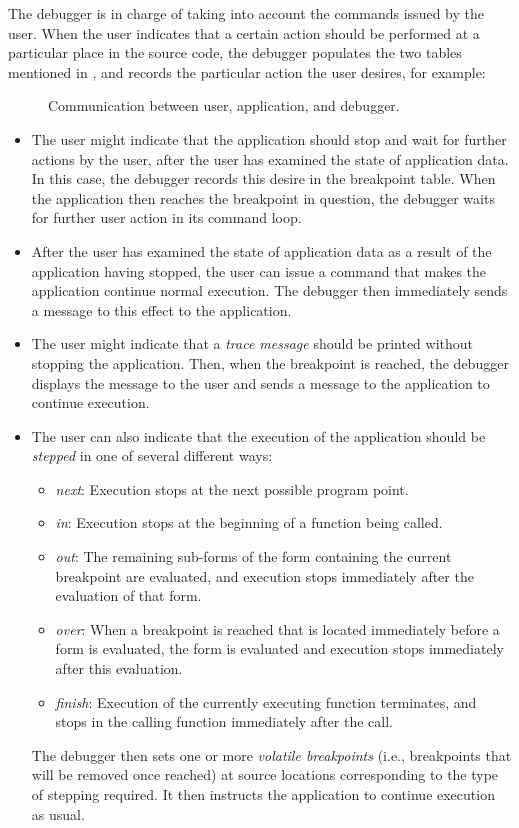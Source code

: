 The debugger is in charge of taking into account the commands issued
by the user.  When the user indicates that a certain action should be
performed at a particular place in the source code, the debugger
populates the two tables mentioned in ,
and records the particular action the user desires, for example:

\begin{figure}
\begin{center}
\end{center}
\caption{\label{fig-communication}
Communication between user, application, and debugger.}
\end{figure}

\begin{itemize}
\item The user might indicate that the application should stop and
  wait for further actions by the user, after the user has examined
  the state of application data.  In this case, the debugger records
  this desire in the breakpoint table.  When the application then
  reaches the breakpoint in question, the debugger waits for further
  user action in its command loop.
\item After the user has examined the state of application data as a
  result of the application having stopped, the user can issue a
  command that makes the application continue normal execution.  The
  debugger then immediately sends a message to this effect to the
  application.
\item The user might indicate that a \emph{trace message} should be
  printed without stopping the application.  Then, when the breakpoint
  is reached, the debugger displays the message to the user and sends
  a message to the application to continue execution.
\item The user can also indicate that the execution of the application
  should be \emph{stepped} in one of several different ways:
  \begin{itemize}
  \item \emph{next}: Execution stops at the next possible
    program point.
  \item \emph{in}: Execution stops at the beginning of a
    function being called.
  \item \emph{out}: The remaining sub-forms of the form containing the
    current breakpoint are evaluated, and execution stops immediately
    after the evaluation of that form.
  \item \emph{over}: When a breakpoint is reached that is located
    immediately before a form is evaluated, the form is evaluated and
    execution stops immediately after this evaluation.
  \item \emph{finish}:  Execution of the currently executing function
    terminates, and stops in the calling function
    immediately after the call.
  \end{itemize}
  The debugger then sets one or more \emph{volatile
    breakpoints} (i.e., breakpoints that will be removed once reached)
  at source locations corresponding to the type of stepping required.
  It then instructs the application to continue execution as usual.
\end{itemize}


